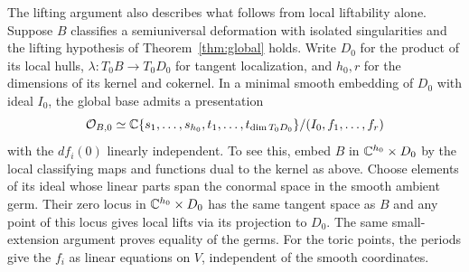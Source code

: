 \begin{remark}
The lifting argument also describes what follows from local
liftability alone. Suppose $B$ classifies a semiuniversal deformation
with isolated singularities and the lifting hypothesis of
Theorem~\ref{thm:global} holds. Write $D_0$ for the product of its
local hulls, $\lambda:T_0B\to T_0D_0$ for tangent localization, and
$h_0,r$ for the dimensions of its kernel and cokernel. In a minimal
smooth embedding of $D_0$ with ideal $I_0$, the global base admits
a presentation
\[
 \mathcal O_{B,0}\simeq \mathbb C\{s_1,\dots,s_{h_0},t_1,\dots,t_{\dim T_0D_0}\}
             /(I_0,f_1,\dots,f_r)
\]
with the $df_i(0)$ linearly independent. To see this, embed $B$ in
$\mathbb C^{h_0}\times D_0$ by the local classifying maps and functions
dual to the kernel as above. Choose elements of its ideal whose
linear parts span the conormal space in the smooth ambient germ.
Their zero locus in $\mathbb C^{h_0}\times D_0$ has the same tangent space
as $B$ and any point of this locus gives local lifts via its
projection to $D_0$. The same small-extension argument proves
equality of the germs. For the toric points, the periods give the
$f_i$ as linear equations on $V$, independent of the smooth
coordinates.
\end{remark}
